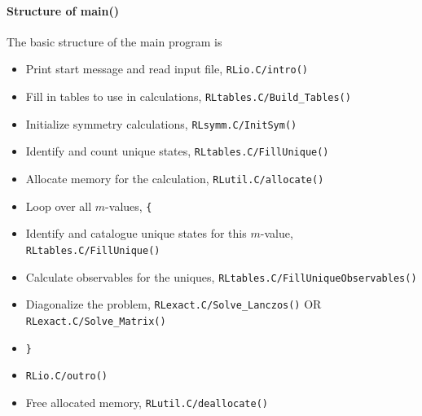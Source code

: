 \documentclass{article}
\begin{document}
\paragraph{Structure of main()} The basic structure of the main program is
\begin{itemize}
\item Print start message and read input file, \verb+RLio.C/intro()+
\item Fill in tables to use in calculations, \verb+RLtables.C/Build_Tables()+
\item Initialize symmetry calculations, \verb+RLsymm.C/InitSym()+
\item Identify and count unique states, \verb+RLtables.C/FillUnique()+
\item Allocate memory for the calculation, \verb+RLutil.C/allocate()+
\item Loop over all $m$-values, \verb+{+
\item \hspace{5mm} Identify and catalogue unique states for this $m$-value, \verb+RLtables.C/FillUnique()+
\item \hspace{5mm} Calculate observables for the uniques, \verb+RLtables.C/FillUniqueObservables()+
\item \hspace{5mm} Diagonalize the problem, \verb+RLexact.C/Solve_Lanczos()+ OR \verb+RLexact.C/Solve_Matrix()+
\item \verb+}+
\item \verb+RLio.C/outro()+
\item Free allocated memory, \verb+RLutil.C/deallocate()+
\end{itemize}
\end{document}
